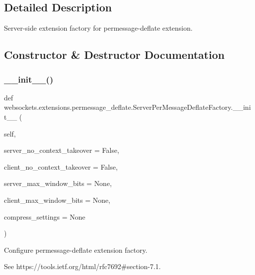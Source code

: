 \subsection{Detailed Description}
\begin{DoxyVerb}Server-side extension factory for permessage-deflate extension.\end{DoxyVerb}
 

\subsection{Constructor \& Destructor Documentation}
\mbox{\label{classwebsockets_1_1extensions_1_1permessage__deflate_1_1_server_per_message_deflate_factory_ae6a7b7e3f1dcf87d99129eba9f1c960a}} 
\subsubsection{\texorpdfstring{\+\_\+\+\_\+init\+\_\+\+\_\+()}{\_\_init\_\_()}}
{\footnotesize\ttfamily def websockets.\+extensions.\+permessage\+\_\+deflate.\+Server\+Per\+Message\+Deflate\+Factory.\+\_\+\+\_\+init\+\_\+\+\_\+ (\begin{DoxyParamCaption}\item[{}]{self,  }\item[{}]{server\+\_\+no\+\_\+context\+\_\+takeover = {\ttfamily False},  }\item[{}]{client\+\_\+no\+\_\+context\+\_\+takeover = {\ttfamily False},  }\item[{}]{server\+\_\+max\+\_\+window\+\_\+bits = {\ttfamily None},  }\item[{}]{client\+\_\+max\+\_\+window\+\_\+bits = {\ttfamily None},  }\item[{}]{compress\+\_\+settings = {\ttfamily None} }\end{DoxyParamCaption})}

\begin{DoxyVerb}Configure permessage-deflate extension factory.

See https://tools.ietf.org/html/rfc7692#section-7.1.\end{DoxyVerb}
 

